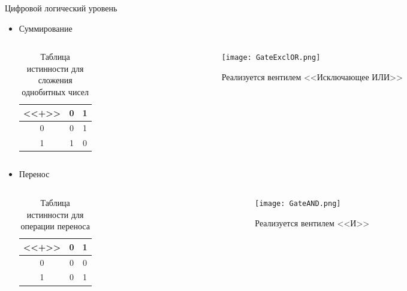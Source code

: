 \documentclass[aspectratio=169,14pt]{beamer}
\begin{document}
\begin{frame}{Цифровой логический уровень}
    \begin{itemize}
        \item Суммирование
        \begin{columns}[T,onlytextwidth]
            \begin{column}{0.5\textwidth}
                \begin{table}
                    \centering
                    \begin{tabular}{c|cc}
                        \textbf{<<+>>} & 0 & 1 \\ \hline
                        0 & 0 & 1 \\
                        1 & 1 & 0
                    \end{tabular}
                    \caption{\tiny{Таблица истинности для сложения однобитных чисел}}
                \end{table}
            \end{column}
            \begin{column}{0.5\textwidth}
                \begin{figure}[htp]
                    \centering
                    \texttt{[image: GateExclOR.png]}
                    \caption{\tiny{Реализуется вентилем <<Исключающее ИЛИ>>}}
                \end{figure}
            \end{column}
        \end{columns}

        \item Перенос
        \begin{columns}[T,onlytextwidth]
            \begin{column}{0.5\textwidth}
                \begin{table}
                    \centering
                    \begin{tabular}{c|cc}
                        \textbf{<<+>>} & 0 & 1 \\ \hline
                        0 & 0 & 0 \\
                        1 & 0 & 1
                    \end{tabular}
                    \caption{\tiny{Таблица истинности для операции переноса}}
                \end{table}
            \end{column}
            \begin{column}{0.5\textwidth}
                \begin{figure}[htp]
                    \centering
                    \texttt{[image: GateAND.png]}
                    \caption{\tiny{Реализуется вентилем <<И>>}}
                \end{figure}
            \end{column}
        \end{columns}
    \end{itemize}
\end{frame}
\end{document}
